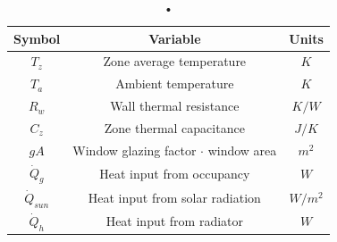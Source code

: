 \begin{table}[H]
\centering
\begin{tabular}{c|c|c}
Symbol & Variable & Units \\
\hline
\hline
$T_z$ & Zone average temperature & $K$\\
$T_a$ & Ambient temperature & $K$\\
$R_w$ & Wall thermal resistance & $K/W$\\
$C_z$ & Zone thermal capacitance & $J/K$\\
$gA$ & Window glazing factor $\cdot$ window area & $m^2$\\
$\dot{Q}_g$ & Heat input from occupancy & $W$\\
$\dot{Q}_{sun}$ & Heat input from solar radiation & $W/m^2$\\
$\dot{Q}_h$ & Heat input from radiator & $W$
\end{tabular}
\caption{•}
\label{tab:nomenclature_model}
\end{table}
